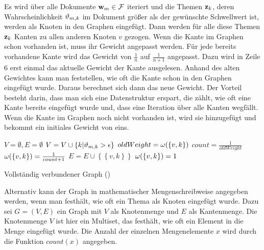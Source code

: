 Es wird über alle Dokumente $\mathbf{w}_m \in \mathcal{F}$ iteriert und die Themen $\mathbf{z}_k$, deren Wahrscheinlichkeit $\vartheta_{m,k}$ im Dokument größer als der gewünschte Schwellwert ist, werden als Knoten in den Graphen eingefügt. Dann werden für alle diese Themen $\mathbf{z}_k$ Kanten zu allen anderen Knoten $v$ gezogen. Wenn die Kante im Graphen schon vorhanden ist, muss ihr Gewicht angepasst werden. Für jede bereits vorhandene Kante wird das Gewicht von $\frac{1}{n}$ auf $\frac{1}{n+1}$ angepasst. Dazu wird in Zeile 6 erst einmal das aktuelle Gewicht der Kante ausgelesen. Anhand des alten Gewichtes kann man feststellen, wie oft die Kante schon in den Graphen eingefügt wurde. Daraus berechnet sich dann das neue Gewicht. Der Vorteil besteht darin, dass man sich eine Datenstruktur erspart, die zählt, wie oft eine Kante bereits eingefügt wurde und, dass eine Iteration über alle Kanten wegfällt. Wenn die Kante im Graphen noch nicht vorhanden ist, wird sie hinzugefügt und bekommt ein initiales Gewicht von eins.

\begin{algorithm}[ht]
\begin{algorithmic}[1]
\STATE $V = \emptyset, E = \emptyset$
  \STATE $V = V \cup \left\lbrace k | \vartheta_{m,k} > \epsilon \right\rbrace$
        \STATE $oldWeight = \omega(\left\lbrace v,k \right\rbrace)$ 
        \STATE $count = \frac{1}{oldWeight}$	
	    \STATE $\omega(\left\lbrace v,k \right\rbrace) = \frac{1}{count + 1}$
      \ELSE
        \STATE $E = E \cup \left\lbrace \left\lbrace v,k \right\rbrace \right\rbrace$
        \STATE $\omega(\left\lbrace v,k \right\rbrace) = 1$
      \ENDIF
    \ENDFOR
  \ENDFOR
\ENDFOR 
\end{algorithmic}
\label{lst:countingSimpleTopicToGraph}
\caption{Vollständig verbundener Graph (\CST)}
\end{algorithm}

Alternativ kann der Graph in mathematischer Mengenschreibweise angegeben werden, wenn man festhält, wie oft ein Thema als Knoten eingefügt wurde. Dazu sei $G=(V,E)$ ein Graph mit $V$ als Knotenmenge und $E$ als Kantenmenge. Die Knotenmenge $V$ ist hier ein Multiset, das festhält, wie oft ein Element in die Menge eingefügt wurde. Die Anzahl der einzelnen Mengenelemente $x$ wird durch die Funktion $count(x)$ angegeben. 

